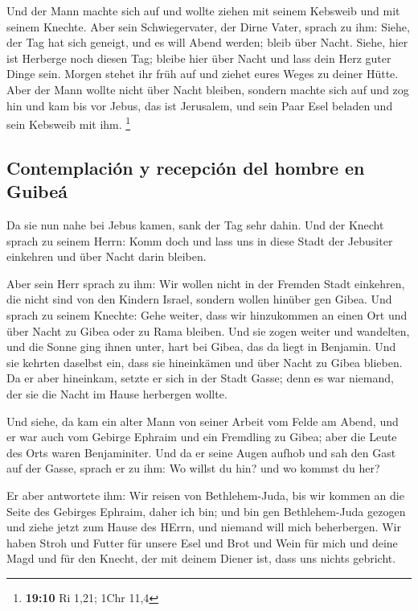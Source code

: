  Und der Mann machte sich auf und wollte ziehen mit seinem
Kebsweib und mit seinem Knechte. Aber sein Schwiegervater, der Dirne
Vater, sprach zu ihm: Siehe, der Tag hat sich geneigt, und es will Abend
werden; bleib über Nacht. Siehe, hier ist Herberge noch diesen Tag;
bleibe hier über Nacht und lass dein Herz guter Dinge sein. Morgen
stehet ihr früh auf und ziehet eures Weges zu deiner Hütte.
 Aber der Mann wollte nicht über Nacht bleiben, sondern
machte sich auf und zog hin und kam bis vor Jebus, das ist Jerusalem,
und sein Paar Esel beladen und sein Kebsweib mit ihm. \footnote{\textbf{19:10}
  Ri 1,21; 1Chr 11,4}

\hypertarget{contemplaciuxf3n-y-recepciuxf3n-del-hombre-en-guibeuxe1}{%
\subsection{Contemplación y recepción del hombre en
Guibeá}\label{contemplaciuxf3n-y-recepciuxf3n-del-hombre-en-guibeuxe1}}

 Da sie nun nahe bei Jebus kamen, sank der Tag sehr
dahin. Und der Knecht sprach zu seinem Herrn: Komm doch und lass uns in
diese Stadt der Jebusiter einkehren und über Nacht darin bleiben.

 Aber sein Herr sprach zu ihm: Wir wollen nicht in der
Fremden Stadt einkehren, die nicht sind von den Kindern Israel, sondern
wollen hinüber gen Gibea.  Und sprach zu seinem Knechte:
Gehe weiter, dass wir hinzukommen an einen Ort und über Nacht zu Gibea
oder zu Rama bleiben.  Und sie zogen weiter und
wandelten, und die Sonne ging ihnen unter, hart bei Gibea, das da liegt
in Benjamin.  Und sie kehrten daselbst ein, dass sie
hineinkämen und über Nacht zu Gibea blieben. Da er aber hineinkam,
setzte er sich in der Stadt Gasse; denn es war niemand, der sie die
Nacht im Hause herbergen wollte.

 Und siehe, da kam ein alter Mann von seiner Arbeit vom
Felde am Abend, und er war auch vom Gebirge Ephraim und ein Fremdling zu
Gibea; aber die Leute des Orts waren Benjaminiter.  Und
da er seine Augen aufhob und sah den Gast auf der Gasse, sprach er zu
ihm: Wo willst du hin? und wo kommst du her?

 Er aber antwortete ihm: Wir reisen von Bethlehem-Juda,
bis wir kommen an die Seite des Gebirges Ephraim, daher ich bin; und bin
gen Bethlehem-Juda gezogen und ziehe jetzt zum Hause des HErrn, und
niemand will mich beherbergen.  Wir haben Stroh und
Futter für unsere Esel und Brot und Wein für mich und deine Magd und für
den Knecht, der mit deinem Diener ist, dass uns nichts gebricht.

